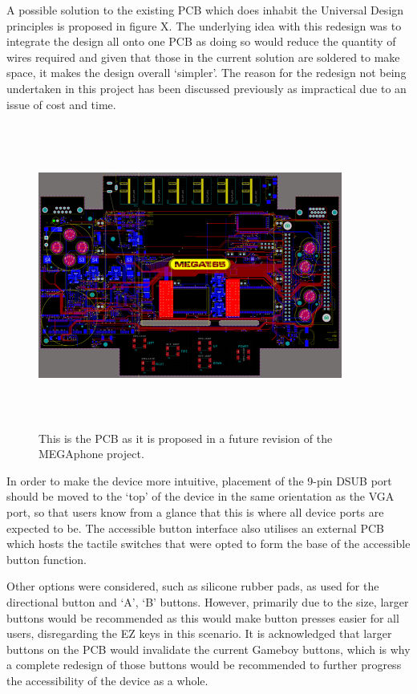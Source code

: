 A possible solution to the existing PCB which does inhabit the Universal Design principles is proposed in figure X. 
The underlying idea with this redesign was to integrate the design all onto one PCB as doing so would reduce the quantity of wires required and given that those in the current solution are soldered to make space, it makes the design overall ‘simpler’.
The reason for the redesign not being undertaken in this project has been discussed previously as impractical due to an issue of cost and time.

\begin{figure} [h]
\begin{centering}
\includegraphics[width=10cm,height=10cm,keepaspectratio]{Figures/pcb_final.png}
\caption{This is the PCB as it is proposed in a future revision of the MEGAphone project.}
\label{fig:ThisFig}
\end{centering}
\end{figure}

In order to make the device more intuitive, placement of the 9-pin DSUB port should be moved to the ‘top’ of the device in the same orientation as the VGA port, so that users know from a glance that this is where all device ports are expected to be.
The accessible button interface also utilises an external PCB which hosts the tactile switches that were opted to form the base of the accessible button function.

Other options were considered, such as silicone rubber pads, as used for the directional button and ‘A’, ‘B’ buttons. 
However, primarily due to the size, larger buttons would be recommended as this would make button presses easier for all users, disregarding the EZ keys in this scenario.
It is acknowledged that larger buttons on the PCB would invalidate the current Gameboy buttons, which is why a complete redesign of those buttons would be recommended to further progress the accessibility of the device as a whole.

